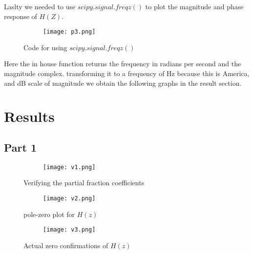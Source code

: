 \documentclass[12pt,a4paper]{article}
\begin{document}
\clearpage

Laslty we needed to use $scipy.signal.freqz()$ to plot the magnitude and phase response of $H(Z)$.


\begin{figure}[h]
\begin{subfigure}{ 1\textwidth}
\texttt{[image: p3.png]}
\end{subfigure}
\caption{Code for using $scipy.signal.freqz()$}
\label{fig:image2}
\end{figure}

Here the in house function returns the frequency in radians per second and the magnitude complex. transforming it to a frequency of Hz because this is America, and dB scale of magnitude we obtain the following graphs in the result section. 



\clearpage

\section{Results}\label{sec:res}

\subsection{Part 1}

\begin{figure}[h]
\centering
\begin{subfigure}{ 1\textwidth}
\texttt{[image: v1.png]}
\end{subfigure}
\caption{ Verifying the partial fraction coefficients  }
\label{fig2:image22}
\end{figure}

\begin{figure}[h]
\centering
\begin{subfigure}{ 1\textwidth}
\texttt{[image: v2.png]}
\end{subfigure}
\caption{ pole-zero plot for $H(z)$ }
\label{fig2:image22}
\end{figure}

\begin{figure}[h]
\centering
\begin{subfigure}{ 1\textwidth}
\texttt{[image: v3.png]}
\end{subfigure}
\caption{ Actual zero confirmations of $H(z)$ }
\label{fig2:image22}
\end{figure}
\end{document}
